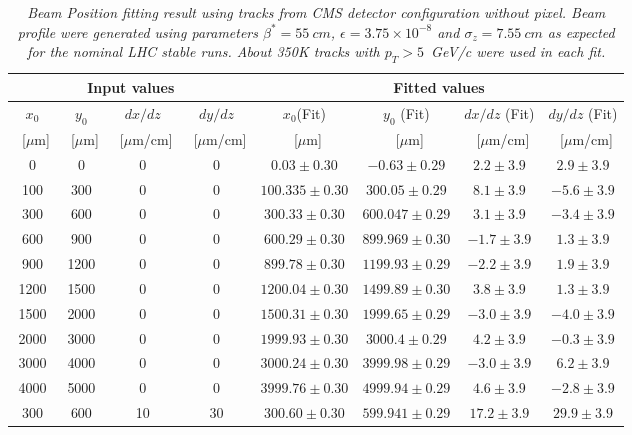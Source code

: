\documentclass{cmspaper}
\begin{document}
\begin{table} [th]

\caption{\it \label{table:BeamSpotNopixelLHC2008} Beam Position fitting result using tracks 
from CMS detector configuration without pixel.  Beam profile were generated using 
parameters $\beta^* =  55~cm$, $\epsilon=3.75 \times 10^{-8}$ and $\sigma_z=7.55~cm$ as 
expected for the nominal LHC stable runs. About 350K tracks with $p_T>5$~GeV/c were used 
in each fit.}
\begin{tabular}{|c|c|c|c|c|c|c|c|} \hline
\multicolumn{4}{|c|}{Input values}& \multicolumn{4}{|c|}{Fitted  values}\\ \hline
$x_0$& $y_0$& $dx/dz$&$dy/dz$ &  $x_0$(Fit) & $y_0$ (Fit) & $dx/dz$ (Fit) & $dy/dz$ (Fit) \\ 
~[$\mu$m] & ~[$\mu$m] & ~[$\mu$m/cm] & ~[$\mu$m/cm] & ~[$\mu$m] & ~[$\mu$m] & ~[$\mu$m/cm] & ~[$\mu$m/cm] \\ \hline
0  &  0 & 0&     0&$  0.03  \pm    0.30$&$ -0.63\pm 0.29 $&$ 2.2 \pm  3.9  $&$ 2.9 \pm  3.9 $ \\ \hline
100& 300& 0&     0&$  100.335\pm   0.30$&$ 300.05 \pm  0.29 $&$ 8.1 \pm  3.9  $&$ -5.6\pm   3.9  $ \\ \hline
300& 600& 0&     0&$  300.33 \pm   0.30$&$ 600.047 \pm  0.29 $&$ 3.1 \pm  3.9  $&$-3.4 \pm  3.9  $ \\ \hline
600& 900& 0&     0&$  600.29\pm   0.30$&$ 899.969 \pm  0.30$&$ -1.7 \pm  3.9 $&$  1.3 \pm  3.9  $ \\ \hline
900& 1200&0&     0&$  899.78 \pm   0.30$&$ 1199.93 \pm  0.29 $&$-2.2  \pm 3.9  $&$ 1.9 \pm  3.9  $ \\ \hline
1200&1500&0&     0&$  1200.04\pm   0.30$&$ 1499.89 \pm  0.30 $&$  3.8 \pm  3.9 $&$  1.3 \pm  3.9  $ \\ \hline
1500&2000&0&     0&$  1500.31 \pm  0.30$&$ 1999.65 \pm  0.29 $&$-3.0  \pm 3.9  $&$-4.0 \pm  3.9  $ \\ \hline
2000&3000&0&     0&$  1999.93 \pm  0.30$&$ 3000.4  \pm  0.29 $&$ 4.2 \pm  3.9  $&$-0.3\pm  3.9 $ \\ \hline 
3000&4000&0&     0&$  3000.24 \pm  0.30$&$ 3999.98 \pm  0.29 $&$-3.0 \pm  3.9  $&$ 6.2 \pm  3.9 $ \\ \hline 
4000&5000&0&     0&$  3999.76 \pm  0.30$&$ 4999.94 \pm  0.29 $&$ 4.6 \pm  3.9  $&$-2.8  \pm 3.9  $ \\ \hline
300& 600& 10&    30&$ 300.60  \pm  0.30$&$ 599.941  \pm 0.29 $&$ 17.2 \pm  3.9  $&$  29.9 \pm 3.9  $ \\ \hline

\end{tabular}
\end{table}
\end{document}

